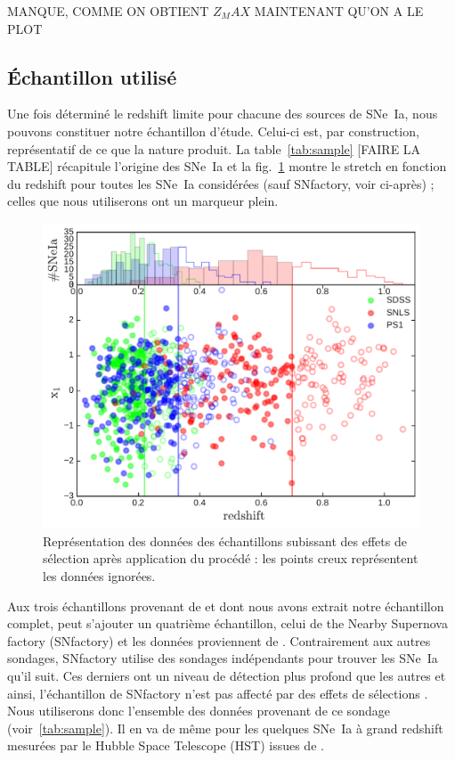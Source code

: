 \documentclass[a4paper, 12pt, svgnames]{article}
\newcommand{\mr}[1]{{\textcolor[rgb]{0.80,0.10,0.1}{#1}}}
\begin{document}
\mr{MANQUE, COMME ON OBTIENT $Z_MAX$ MAINTENANT QU'ON A LE PLOT}

\subsection{Échantillon utilisé}

Une fois déterminé le redshift limite pour chacune des sources de SNe~Ia, nous
pouvons constituer notre échantillon d'étude. Celui-ci est, par construction,
représentatif de ce que la nature produit. La table~\ref{tab:sample} [FAIRE LA
TABLE] récapitule l'origine des SNe~Ia et la fig.~\ref{fig:surveys_cuts} montre
le stretch en fonction du redshift pour toutes les SNe~Ia considérées (sauf
SNfactory, voir ci-après) ; celles que nous utiliserons ont un marqueur plein.
\bigbreak

\begin{figure}[htbp!]
    \centering
    \includegraphics[width=.5\linewidth]{Rapport_figures/surveys_cuts.pdf}
    \captionsetup{justification=centering}
    \caption{Représentation des données des échantillons subissant des effets
    de sélection après application du procédé : les points creux représentent
    les données ignorées.}
    \label{fig:surveys_cuts}
\end{figure}

Aux trois échantillons provenant de \cite{scolnic_complete_2018} et dont nous
avons extrait notre échantillon complet, peut s'ajouter un quatrième
échantillon, celui de the Nearby Supernova factory (SNfactory)
\cite{wood-vasey_nearby_2004} et les données proviennent de
\cite{rigault_strong_2018}.  Contrairement aux autres sondages, SNfactory
utilise des sondages indépendants pour trouver les SNe~Ia qu'il suit. Ces
derniers ont un niveau de détection plus profond que les autres et ainsi,
l'échantillon de SNfactory n'est pas affecté par des effets de sélections
\cite{rigault_strong_2018}. Nous utiliserons donc l'ensemble des données
provenant de ce sondage (voir~\ref{tab:sample}). Il en va de même pour les
quelques SNe~Ia à grand redshift mesurées par le Hubble Space Telescope (HST)
issues de \cite{scolnic_complete_2018}. \bigbreak
\end{document}
